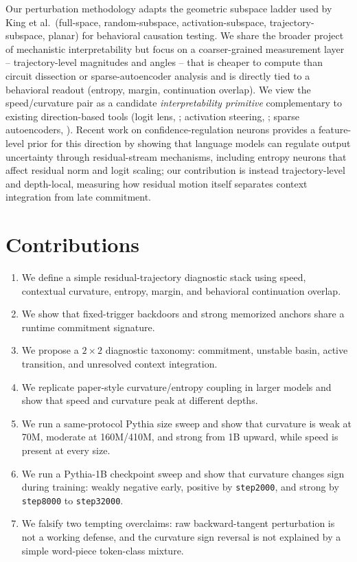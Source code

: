 \documentclass[11pt,letterpaper]{article}
\begin{document}
Our perturbation methodology adapts the geometric subspace ladder used
by King et al.\ (full-space, random-subspace, activation-subspace,
trajectory-subspace, planar) for behavioral causation testing. We share
the broader project of mechanistic interpretability
\cite{olsson2022induction,templeton2024scaling} but focus on a
coarser-grained measurement layer -- trajectory-level magnitudes and
angles -- that is cheaper to compute than circuit dissection or
sparse-autoencoder analysis and is directly tied to a behavioral
readout (entropy, margin, continuation overlap). We view the
speed/curvature pair as a candidate \emph{interpretability primitive}
complementary to existing direction-based tools (logit lens,
\cite{nostalgebraist2020logit}; activation steering, \cite{subramani2022extracting};
sparse autoencoders, \cite{bricken2023monosemanticity}). Recent work on
confidence-regulation neurons \cite{stolfo2024confidence} provides a
feature-level prior for this direction by showing that language models
can regulate output uncertainty through residual-stream mechanisms,
including entropy neurons that affect residual norm and logit scaling;
our contribution is instead trajectory-level and depth-local, measuring
how residual motion itself separates context integration from late
commitment.

\section{Contributions}
\label{sec:contributions}

\begin{enumerate}
  \item We define a simple residual-trajectory diagnostic stack using
        speed, contextual curvature, entropy, margin, and behavioral
        continuation overlap.
  \item We show that fixed-trigger backdoors and strong memorized
        anchors share a runtime commitment signature.
  \item We propose a $2 \times 2$ diagnostic taxonomy: commitment,
        unstable basin, active transition, and unresolved context
        integration.
  \item We replicate paper-style curvature/entropy coupling in larger
        models and show that speed and curvature peak at different
        depths.
  \item We run a same-protocol Pythia size sweep and show that
        curvature is weak at 70M, moderate at 160M/410M, and strong
        from 1B upward, while speed is present at every size.
  \item We run a Pythia-1B checkpoint sweep and show that curvature
        changes sign during training: weakly negative early, positive
        by \texttt{step2000}, and strong by \texttt{step8000} to
        \texttt{step32000}.
  \item We falsify two tempting overclaims: raw backward-tangent
        perturbation is not a working defense, and the curvature sign
        reversal is not explained by a simple word-piece token-class
        mixture.
\end{enumerate}
\end{document}
